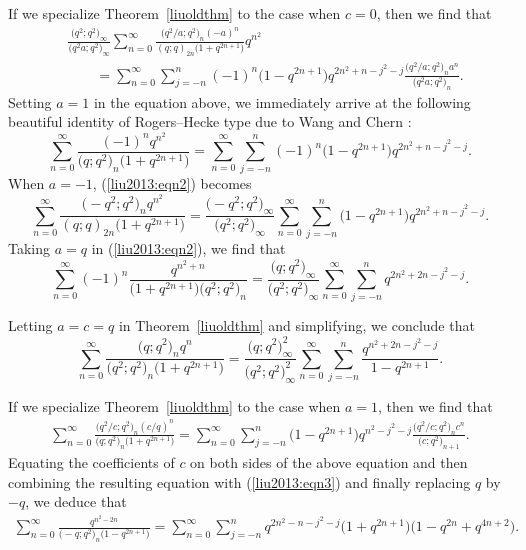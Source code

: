 \documentclass[10pt,a4paper]{amsart}
\numberwithin{equation}{section}
\begin{document}
If we specialize Theorem~\ref{liuoldthm} to the case when $c=0$, then we find that
\begin{align}
	&\frac{\bigl(q^2; q^2\bigr)_\infty}{\bigl(q^2a; q^2\bigr)_\infty}\sum_{n=0}^\infty
	\frac{\bigl(q^2/a; q^2\bigr)_n (-a)^n }{(q; q)_{2n} \bigl(1+q^{2n+1}\bigr)}q^{n^2} \nonumber\\
	&\qquad{}=\sum_{n=0}^\infty \sum_{j=-n}^n (-1)^n\bigl(1-q^{2n+1}\bigr) q^{2n^2+n-j^2-j}
	\frac{\bigl(q^2/a; q^2\bigr)_n a^n}{\bigl(q^2a; q^2\bigr)_n}.\label{liu2013:eqn2}
\end{align}
Setting $a=1$ in the equation above, we immediately arrive at the following beautiful identity of Rogers--Hecke type due to Wang and Chern \cite[equation~(2.9)]{WangChern2019}:
\begin{equation}\label{liu2013:eqn3}
	\sum_{n=0}^\infty \frac{(-1)^n q^{n^2}}{\bigl(q; q^2\bigr)_n \bigl(1+q^{2n+1}\bigr)}
	=\sum_{n=0}^\infty \sum_{j=-n}^n (-1)^n \bigl(1-q^{2n+1}\bigr) q^{2n^2+n-j^2-j}.
\end{equation}
When $a=-1$, (\ref{liu2013:eqn2}) becomes
\begin{equation*}%
	\sum_{n=0}^\infty
	\frac{\bigl(-q^2; q^2\bigr)_n q^{n^2}}{(q; q)_{2n} \bigl(1+q^{2n+1}\bigr)}
	=\frac{\bigl(-q^2; q^2\bigr)_\infty}{\bigl(q^2; q^2\bigr)_\infty}
	\sum_{n=0}^\infty \sum_{j=-n}^n \bigl(1-q^{2n+1}\bigr) q^{2n^2+n-j^2-j}.
\end{equation*}
Taking $a=q$ in (\ref{liu2013:eqn2}), we find that
\begin{equation*}%
	\sum_{n=0}^\infty (-1)^n \frac{q^{n^2+n}}{\bigl(1+q^{2n+1}\bigr)\bigl(q^2; q^2\bigr)_n}
	=\frac{\bigl(q; q^2\bigr)_\infty}{\bigl(q^2; q^2\bigr)_\infty}
	\sum_{n=0}^\infty \sum_{j=-n}^n q^{2n^2+2n-j^2-j}.
\end{equation*}

Letting $a=c=q$ in Theorem~\ref{liuoldthm} and simplifying, we conclude that
\begin{equation*}%
	\sum_{n=0}^\infty\frac{\bigl(q; q^2\bigr)_n q^n}{\bigl(q^2; q^2\bigr)_n \bigl(1+q^{2n+1}\bigr)}
	=\frac{\bigl(q; q^2\bigr)_\infty^2}{\bigl(q^2; q^2\bigr)^2_\infty}
	\sum_{n=0}^\infty \sum_{j=-n}^n \frac{q^{n^2+2n-j^2-j}}{1-q^{2n+1}}.
\end{equation*}

If we specialize Theorem~\ref{liuoldthm} to the case when $a=1$, then we find that
\begin{align*} %
	\sum_{n=0}^\infty \frac{\bigl(q^2/c; q^2\bigr)_n (c/q)^n}{\bigl(q; q^2\bigr)_n \bigl(1+q^{2n+1}\bigr)}
	=\sum_{n=0}^\infty \sum_{j=-n}^n \bigl(1-q^{2n+1}\bigr) q^{n^2-j^2-j} \frac{\bigl(q^2/c; q^2\bigr)_n c^n}{\bigl(c; q^2\bigr)_{n+1}}.
\end{align*}
Equating the coefficients of $c$ on both sides of the above equation and then combining the resulting equation with (\ref{liu2013:eqn3}) and finally replacing $q$ by $-q$, we deduce that
\begin{align*}
\sum_{n=0}^{\infty} \frac{ q^{n^2-2n}}{\bigl(-q; q^2\bigr)_n \bigl(1-q^{2n+1}\bigr)}
=\sum_{n=0}^{\infty} \sum_{j=-n}^{n} q^{2n^2-n-j^2-j}\bigl(1+q^{2n+1}\bigr)\bigl(1-q^{2n}+q^{4n+2}\bigr).
\end{align*}
\end{document}

